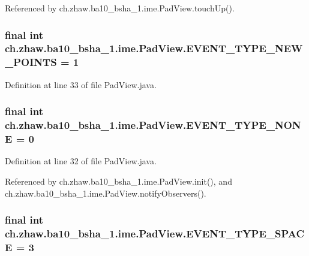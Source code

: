 Referenced by ch.zhaw.ba10\_\-bsha\_\-1.ime.PadView.touchUp().\hypertarget{classch_1_1zhaw_1_1ba10__bsha__1_1_1ime_1_1PadView_a25e2262d68474969ad4d9ddd4abf79a9}{
\subsubsection[{EVENT\_\-TYPE\_\-NEW\_\-POINTS}]{\setlength{\rightskip}{0pt plus 5cm}final int {\bf ch.zhaw.ba10\_\-bsha\_\-1.ime.PadView.EVENT\_\-TYPE\_\-NEW\_\-POINTS} = 1}}
\label{classch_1_1zhaw_1_1ba10__bsha__1_1_1ime_1_1PadView_a25e2262d68474969ad4d9ddd4abf79a9}


Definition at line 33 of file PadView.java.\hypertarget{classch_1_1zhaw_1_1ba10__bsha__1_1_1ime_1_1PadView_a125bdca474db5a2f392bd3036673abc2}{
\subsubsection[{EVENT\_\-TYPE\_\-NONE}]{\setlength{\rightskip}{0pt plus 5cm}final int {\bf ch.zhaw.ba10\_\-bsha\_\-1.ime.PadView.EVENT\_\-TYPE\_\-NONE} = 0}}
\label{classch_1_1zhaw_1_1ba10__bsha__1_1_1ime_1_1PadView_a125bdca474db5a2f392bd3036673abc2}


Definition at line 32 of file PadView.java.

Referenced by ch.zhaw.ba10\_\-bsha\_\-1.ime.PadView.init(), and ch.zhaw.ba10\_\-bsha\_\-1.ime.PadView.notifyObservers().\hypertarget{classch_1_1zhaw_1_1ba10__bsha__1_1_1ime_1_1PadView_af16e51780a0ada3ad00a022717084b41}{
\subsubsection[{EVENT\_\-TYPE\_\-SPACE}]{\setlength{\rightskip}{0pt plus 5cm}final int {\bf ch.zhaw.ba10\_\-bsha\_\-1.ime.PadView.EVENT\_\-TYPE\_\-SPACE} = 3}}
\label{classch_1_1zhaw_1_1ba10__bsha__1_1_1ime_1_1PadView_af16e51780a0ada3ad00a022717084b41}


